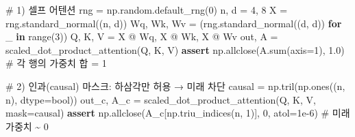 \documentclass[
  korean,
]{article}
\newenvironment{Shaded}{\begin{snugshade}}{\end{snugshade}}
\newcommand{\BuiltInTok}[1]{\textcolor[rgb]{0.00,0.23,0.31}{#1}}
\newcommand{\CommentTok}[1]{\textcolor[rgb]{0.37,0.37,0.37}{#1}}
\newcommand{\ControlFlowTok}[1]{\textcolor[rgb]{0.00,0.23,0.31}{\textbf{#1}}}
\newcommand{\DecValTok}[1]{\textcolor[rgb]{0.68,0.00,0.00}{#1}}
\newcommand{\FloatTok}[1]{\textcolor[rgb]{0.68,0.00,0.00}{#1}}
\newcommand{\KeywordTok}[1]{\textcolor[rgb]{0.00,0.23,0.31}{\textbf{#1}}}
\newcommand{\NormalTok}[1]{\textcolor[rgb]{0.00,0.23,0.31}{#1}}
\newcommand{\OperatorTok}[1]{\textcolor[rgb]{0.37,0.37,0.37}{#1}}
\begin{document}
\begin{Shaded}
\begin{Highlighting}[]
\CommentTok{\# 1) 셀프 어텐션}
\NormalTok{rng }\OperatorTok{=}\NormalTok{ np.random.default\_rng(}\DecValTok{0}\NormalTok{)}
\NormalTok{n, d }\OperatorTok{=} \DecValTok{4}\NormalTok{, }\DecValTok{8}
\NormalTok{X }\OperatorTok{=}\NormalTok{ rng.standard\_normal((n, d))}
\NormalTok{Wq, Wk, Wv }\OperatorTok{=}\NormalTok{ (rng.standard\_normal((d, d)) }\ControlFlowTok{for}\NormalTok{ \_ }\KeywordTok{in} \BuiltInTok{range}\NormalTok{(}\DecValTok{3}\NormalTok{))}
\NormalTok{Q, K, V }\OperatorTok{=}\NormalTok{ X }\OperatorTok{@}\NormalTok{ Wq, X }\OperatorTok{@}\NormalTok{ Wk, X }\OperatorTok{@}\NormalTok{ Wv}
\NormalTok{out, A }\OperatorTok{=}\NormalTok{ scaled\_dot\_product\_attention(Q, K, V)}
\ControlFlowTok{assert}\NormalTok{ np.allclose(A.}\BuiltInTok{sum}\NormalTok{(axis}\OperatorTok{=}\DecValTok{1}\NormalTok{), }\FloatTok{1.0}\NormalTok{)        }\CommentTok{\# 각 행의 가중치 합 = 1}

\CommentTok{\# 2) 인과(causal) 마스크: 하삼각만 허용 → 미래 차단}
\NormalTok{causal }\OperatorTok{=}\NormalTok{ np.tril(np.ones((n, n), dtype}\OperatorTok{=}\BuiltInTok{bool}\NormalTok{))}
\NormalTok{out\_c, A\_c }\OperatorTok{=}\NormalTok{ scaled\_dot\_product\_attention(Q, K, V, mask}\OperatorTok{=}\NormalTok{causal)}
\ControlFlowTok{assert}\NormalTok{ np.allclose(A\_c[np.triu\_indices(n, }\DecValTok{1}\NormalTok{)], }\DecValTok{0}\NormalTok{, atol}\OperatorTok{=}\FloatTok{1e{-}6}\NormalTok{)  }\CommentTok{\# 미래 가중치 \textasciitilde{} 0}
\end{Highlighting}
\end{Shaded}
\end{document}
